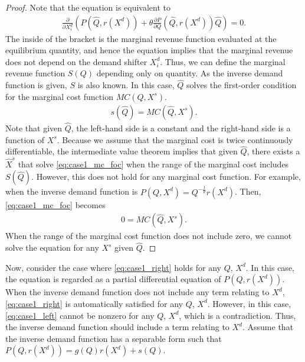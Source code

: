 \documentclass[11pt, a4paper]{article}
\theoremstyle{remark}
\begin{document}
\begin{proof}
    Note that the equation is equivalent to
    \begin{align}
        \frac{\partial}{\partial X^{d}_i}\left( P(\hat{Q}, r(X^{d})) + \theta\frac{\partial P}{\partial Q}(\hat{Q}, r(X^{d}))\hat{Q}\right) = 0.
    \end{align}
    The inside of the bracket is the marginal revenue function evaluated at the equilibrium quantity, and hence the equation implies that the marginal revenue does not depend on the demand shifter $X^{d}_i$.
    Thus, we can define the marginal revenue function $S(Q)$ depending only on quantity.
    As the inverse demand function is given, $S$ is also known.
    In this case, $\hat{Q}$ solves the first-order condition for the marginal cost function $MC(Q, X^{s})$.
    \begin{align}
        s(\hat{Q}) =  MC(\hat{Q}, X^{s}). \label{eq:case1_mc_foc}
    \end{align}
    Note that given $\hat{Q}$, the left-hand side is a constant and the right-hand side is a function of $X^{s}$.
    Because we assume that the marginal cost is twice continuously differentiable, the intermediate value theorem implies that given $\hat{Q}$, there exists a $\hat{X}^{s}$ that solve \eqref{eq:case1_mc_foc} when the range of the marginal cost includes $S(\hat{Q})$.    
    However, this does not hold for any marginal cost function.
    For example, when the inverse demand function is $P(Q, X^{d}) = Q^{-\frac{1}{\theta}}r(X^{d})$.
    Then, \eqref{eq:case1_mc_foc} becomes
    \begin{align}
        0 = MC(\hat{Q}, X^{s}).
    \end{align}
    When the range of the marginal cost function does not include zero, we cannot solve the equation for any $X^{s}$ given $\hat{Q}$.
\end{proof}



Now, consider the case where \eqref{eq:case1_right} holds for any $Q$, $X^{d}$.
In this case, the equation is regarded as a partial differential equation of $P(Q, r(X^{d}))$.
When the inverse demand function does not include any term relating to $X^{d}$, \eqref{eq:case1_right} is automatically satisfied for any $Q$, $X^{d}$.
However, in this case, \eqref{eq:case1_left} cannot be nonzero for any $Q$, $X^{d}$, which is a contradiction.
Thus, the inverse demand function should include a term relating to $X^{d}$.
Assume that the inverse demand function has a separable form such that $P(Q, r(X^{d})) = g(Q)r(X^{d}) + s(Q)$.
\end{document}
